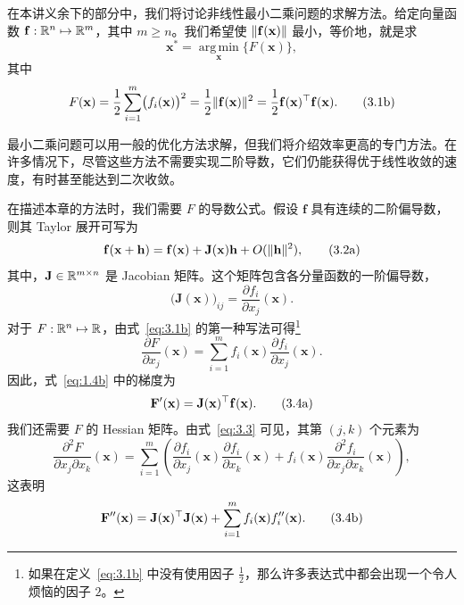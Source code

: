 在本讲义余下的部分中，我们将讨论非线性最小二乘问题的求解方法。给定向量函数 $\mathbf{f}:\mathbb{R}^n\mapsto\mathbb{R}^m$，其中 $m\geq n$。我们希望使 $\lVert\mathbf{f}(\mathbf{x})\rVert$ 最小，等价地，就是求
\begin{equation}
  \mathbf{x}^*=\operatorname*{arg\,min}_{\mathbf{x}}\{F(\mathbf{x})\},
  \tag{3.1a}\label{eq:3.1a}
\end{equation}
其中
\begin{equation}
  F(\mathbf{x})=\frac12\sum_{i=1}^m\bigl(f_i(\mathbf{x})\bigr)^2
  =\frac12\lVert\mathbf{f}(\mathbf{x})\rVert^2
  =\frac12\mathbf{f}(\mathbf{x})^{\top}\mathbf{f}(\mathbf{x}).
  \tag{3.1b}\label{eq:3.1b}
\end{equation}

最小二乘问题可以用一般的优化方法求解，但我们将介绍效率更高的专门方法。在许多情况下，尽管这些方法不需要实现二阶导数，它们仍能获得优于线性收敛的速度，有时甚至能达到二次收敛。

在描述本章的方法时，我们需要 $F$ 的导数公式。假设 $\mathbf{f}$ 具有连续的二阶偏导数，则其 Taylor 展开可写为
\begin{equation}
  \mathbf{f}(\mathbf{x}+\mathbf{h})=\mathbf{f}(\mathbf{x})+\mathbf{J}(\mathbf{x})\mathbf{h}
  +O(\lVert\mathbf{h}\rVert^2),
  \tag{3.2a}\label{eq:3.2a}
\end{equation}
其中，$\mathbf{J}\in\mathbb{R}^{m\times n}$ 是 Jacobian 矩阵。这个矩阵包含各分量函数的一阶偏导数，
\begin{equation}
  \bigl(\mathbf{J}(\mathbf{x})\bigr)_{ij}
  =\frac{\partial f_i}{\partial x_j}(\mathbf{x}).
  \tag{3.2b}\label{eq:3.2b}
\end{equation}
对于 $F:\mathbb{R}^n\mapsto\mathbb{R}$，由式~\eqref{eq:3.1b} 的第一种写法可得\footnote{如果在定义~\eqref{eq:3.1b} 中没有使用因子 $\tfrac12$，那么许多表达式中都会出现一个令人烦恼的因子 $2$。}
\begin{equation}
  \frac{\partial F}{\partial x_j}(\mathbf{x})
  =\sum_{i=1}^m f_i(\mathbf{x})\frac{\partial f_i}{\partial x_j}(\mathbf{x}).
  \tag{3.3}\label{eq:3.3}
\end{equation}
因此，式~\eqref{eq:1.4b} 中的梯度为
\begin{equation}
  \mathbf{F}'(\mathbf{x})=\mathbf{J}(\mathbf{x})^{\top}\mathbf{f}(\mathbf{x}).
  \tag{3.4a}\label{eq:3.4a}
\end{equation}
我们还需要 $F$ 的 Hessian 矩阵。由式~\eqref{eq:3.3} 可见，其第 $(j,k)$ 个元素为
\[
  \frac{\partial^2 F}{\partial x_j\partial x_k}(\mathbf{x})
  =\sum_{i=1}^m\left(
    \frac{\partial f_i}{\partial x_j}(\mathbf{x})
    \frac{\partial f_i}{\partial x_k}(\mathbf{x})
    +f_i(\mathbf{x})\frac{\partial^2 f_i}{\partial x_j\partial x_k}(\mathbf{x})
  \right),
\]
这表明
\begin{equation}
  \mathbf{F}''(\mathbf{x})=\mathbf{J}(\mathbf{x})^{\top}\mathbf{J}(\mathbf{x})
  +\sum_{i=1}^m f_i(\mathbf{x})f_i''(\mathbf{x}).
  \tag{3.4b}\label{eq:3.4b}
\end{equation}

